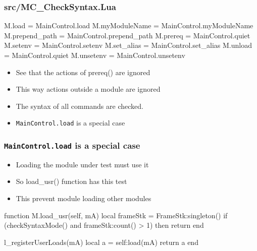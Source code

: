 \documentclass{beamer}
\begin{document}
\begin{frame}[fragile]
    \frametitle{src/MC\_CheckSyntax.Lua}
 {\tiny
    \begin{semiverbatim}
M.load                 = MainControl.load
M.myModuleName         = MainControl.myModuleName
M.prepend\_path         = MainControl.prepend\_path
M.prereq               = MainControl.quiet
M.setenv               = MainControl.setenv
M.set\_alias            = MainControl.set\_alias
M.unload               = MainControl.quiet
M.unsetenv             = MainControl.unsetenv
    \end{semiverbatim}
}
  \begin{itemize}
    \item See that the actions of prereq() are ignored
    \item This way actions outside a module are ignored
    \item The syntax of all commands are checked.
    \item \texttt{MainControl.load} is a special case
  \end{itemize}

\end{frame}

\begin{frame}[fragile]
    \frametitle{\texttt{MainControl.load} is a special case}
  \begin{itemize}
    \item Loading the module under test must use it
    \item So load\_usr()  function has this test
    \item This prevent module loading other modules
  \end{itemize}
 {\tiny
    \begin{semiverbatim}
function M.load_usr(self, mA)
   local frameStk = FrameStk:singleton()
   if (checkSyntaxMode() and frameStk:count() > 1) then
      return {}
   end

   l_registerUserLoads(mA)
   local a = self:load(mA)
   return a
end
    \end{semiverbatim}
}

\end{frame}
\end{document}
